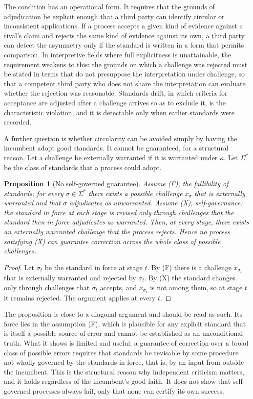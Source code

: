 \documentclass[11pt]{article}
\newtheorem{proposition}{Proposition}
\theoremstyle{remark}
\begin{document}
The condition has an operational form. It requires that the grounds of adjudication be explicit enough that a third party can identify circular or inconsistent applications. If a process accepts a given kind of evidence against a rival's claim and rejects the same kind of evidence against its own, a third party can detect the asymmetry only if the standard is written in a form that permits comparison. In interpretive fields where full explicitness is unattainable, the requirement weakens to this: the grounds on which a challenge was rejected must be stated in terms that do not presuppose the interpretation under challenge, so that a competent third party who does not share the interpretation can evaluate whether the rejection was reasonable. Standards drift, in which criteria for acceptance are adjusted after a challenge arrives so as to exclude it, is the characteristic violation, and it is detectable only when earlier standards were recorded.

A further question is whether circularity can be avoided simply by having the incumbent adopt good standards. It cannot be guaranteed, for a structural reason. Let a challenge be externally warranted if it is warranted under $\kappa$. Let $\Sigma^*$ be the class of standards that a process could adopt.

\begin{proposition}[No self-governed guarantee]
\label{prop:selfgov}
Assume (F), the fallibility of standards: for every $\sigma\in\Sigma^*$ there exists a possible challenge $x_\sigma$ that is externally warranted and that $\sigma$ adjudicates as unwarranted. Assume (X), self-governance: the standard in force at each stage is revised only through challenges that the standard then in force adjudicates as warranted. Then, at every stage, there exists an externally warranted challenge that the process rejects. Hence no process satisfying (X) can guarantee correction across the whole class of possible challenges.
\end{proposition}

\begin{proof}
Let $\sigma_t$ be the standard in force at stage $t$. By (F) there is a challenge $x_{\sigma_t}$ that is externally warranted and rejected by $\sigma_t$. By (X) the standard changes only through challenges that $\sigma_t$ accepts, and $x_{\sigma_t}$ is not among them, so at stage $t$ it remains rejected. The argument applies at every $t$.
\end{proof}

The proposition is close to a diagonal argument and should be read as such. Its force lies in the assumption (F), which is plausible for any explicit standard that is itself a possible source of error and cannot be established as an unconditional truth. What it shows is limited and useful: a guarantee of correction over a broad class of possible errors requires that standards be revisable by some procedure not wholly governed by the standards in force, that is, by an input from outside the incumbent. This is the structural reason why independent criticism matters, and it holds regardless of the incumbent's good faith. It does not show that self-governed processes always fail, only that none can certify its own success.
\end{document}
